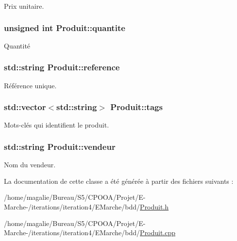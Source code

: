 Prix unitaire. 

\hypertarget{class_produit_a6c569e4c47aed9ee050bb0aa9455dd62}{
\subsubsection[{quantite}]{\setlength{\rightskip}{0pt plus 5cm}unsigned int Produit\-::quantite\hspace{0.3cm}{\ttfamily [protected]}}}\label{class_produit_a6c569e4c47aed9ee050bb0aa9455dd62}


Quantité 

\hypertarget{class_produit_a373d0a18812023e675ae981ca9618209}{
\subsubsection[{reference}]{\setlength{\rightskip}{0pt plus 5cm}std\-::string Produit\-::reference\hspace{0.3cm}{\ttfamily [protected]}}}\label{class_produit_a373d0a18812023e675ae981ca9618209}


Référence unique. 

\hypertarget{class_produit_a0fe989b845422996d650da8e5cc09fcf}{
\subsubsection[{tags}]{\setlength{\rightskip}{0pt plus 5cm}std\-::vector$<$std\-::string$>$ Produit\-::tags\hspace{0.3cm}{\ttfamily [protected]}}}\label{class_produit_a0fe989b845422996d650da8e5cc09fcf}


Mots-\/clés qui identifient le produit. 

\hypertarget{class_produit_a176eb59190cd9b761814fd5c68a8353b}{
\subsubsection[{vendeur}]{\setlength{\rightskip}{0pt plus 5cm}std\-::string Produit\-::vendeur\hspace{0.3cm}{\ttfamily [protected]}}}\label{class_produit_a176eb59190cd9b761814fd5c68a8353b}


Nom du vendeur. 



La documentation de cette classe a été générée à partir des fichiers suivants \-:\begin{DoxyCompactItemize}
\item 
/home/magalie/\-Bureau/\-S5/\-C\-P\-O\-O\-A/\-Projet/\-E-\/\-Marche-\//iterations/iteration4/\-E\-Marche/bdd/\hyperlink{_produit_8h}{Produit.\-h}\item 
/home/magalie/\-Bureau/\-S5/\-C\-P\-O\-O\-A/\-Projet/\-E-\/\-Marche-\//iterations/iteration4/\-E\-Marche/bdd/\hyperlink{_produit_8cpp}{Produit.\-cpp}\end{DoxyCompactItemize}
